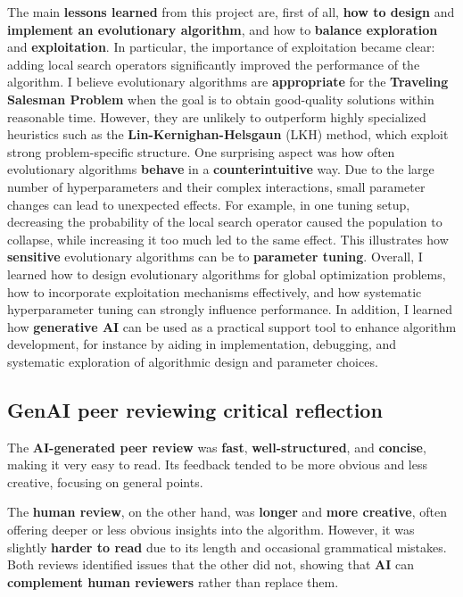 \documentclass[a4paper,10pt]{article} %
\begin{document}
\noindent
The main \textbf{lessons learned} from this project are, first of all, \textbf{how to design} and \textbf{implement an evolutionary algorithm}, and how to \textbf{balance exploration} and \textbf{exploitation}. In particular, the importance of exploitation became clear: adding local search operators significantly improved the performance of the algorithm.
I believe evolutionary algorithms are \textbf{appropriate} for the \textbf{Traveling Salesman Problem} when the goal is to obtain good-quality solutions within reasonable time. However, they are unlikely to outperform highly specialized heuristics such as the \textbf{Lin-Kernighan-Helsgaun} (LKH) method, which exploit strong problem-specific structure.
One surprising aspect was how often evolutionary algorithms \textbf{behave} in a \textbf{counterintuitive} way. Due to the large number of hyperparameters and their complex interactions, small parameter changes can lead to unexpected effects. For example, in one tuning setup, decreasing the probability of the local search operator caused the population to collapse, while increasing it too much led to the same effect. This illustrates how \textbf{sensitive} evolutionary algorithms can be to \textbf{parameter tuning}.
Overall, I learned how to design evolutionary algorithms for global optimization problems, how to incorporate exploitation mechanisms effectively, and how systematic hyperparameter tuning can strongly influence performance.
In addition, I learned how \textbf{generative AI} can be used as a practical support tool to enhance algorithm development, for instance by aiding in implementation, debugging, and systematic exploration of algorithmic design and parameter choices.


\subsection{GenAI peer reviewing critical reflection} \label{sec_genAI}
\noindent
The \textbf{AI-generated peer review} was \textbf{fast}, \textbf{well-structured}, and \textbf{concise}, making it very easy to read. Its feedback tended to be more obvious and less creative, focusing on general points. 

\noindent
The \textbf{human review}, on the other hand, was \textbf{longer} and \textbf{more creative}, often offering deeper or less obvious insights into the algorithm. However, it was slightly \textbf{harder to read} due to its length and occasional grammatical mistakes. Both reviews identified issues that the other did not, showing that \textbf{AI} can \textbf{complement human reviewers} rather than replace them.
\end{document}
